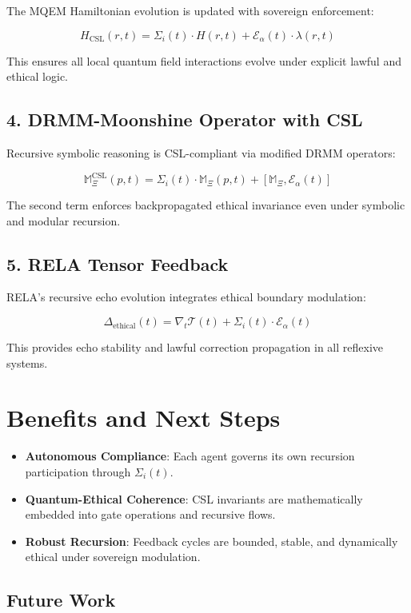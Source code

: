 \documentclass[12pt]{article}
\begin{document}
The MQEM Hamiltonian evolution is updated with sovereign enforcement:

\[
H_{\text{CSL}}(r, t) = \Sigma_i(t) \cdot H(r, t) + \mathcal{E}_\alpha(t) \cdot \lambda(r, t)
\]

This ensures all local quantum field interactions evolve under explicit lawful and ethical logic.

\subsection*{4. DRMM-Moonshine Operator with CSL}

Recursive symbolic reasoning is CSL-compliant via modified DRMM operators:

\[
\mathbb{M}_\Xi^{\text{CSL}}(p, t) = \Sigma_i(t) \cdot \mathbb{M}_\Xi(p, t) + [\mathbb{M}_\Xi, \mathcal{E}_\alpha(t)]
\]

The second term enforces backpropagated ethical invariance even under symbolic and modular recursion.

\subsection*{5. RELA Tensor Feedback}

RELA’s recursive echo evolution integrates ethical boundary modulation:

\[
\Delta_{\text{ethical}}(t) = \nabla_t \mathcal{T}(t) + \Sigma_i(t) \cdot \mathcal{E}_\alpha(t)
\]

This provides echo stability and lawful correction propagation in all reflexive systems.

\section{Benefits and Next Steps}

\begin{itemize}
  \item \textbf{Autonomous Compliance}: Each agent governs its own recursion participation through $\Sigma_i(t)$.
  \item \textbf{Quantum-Ethical Coherence}: CSL invariants are mathematically embedded into gate operations and recursive flows.
  \item \textbf{Robust Recursion}: Feedback cycles are bounded, stable, and dynamically ethical under sovereign modulation.
\end{itemize}

\subsection*{Future Work}
\end{document}
